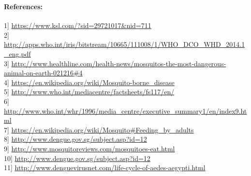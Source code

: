 \documentclass[11pt]{exam}
\begin{document}
\textbf{References:} \\ \\
 1] \url{https://www.ksl.com/?sid=29721017&nid=711} \\
 2] \url{http://apps.who.int/iris/bitstream/10665/111008/1/WHO_DCO_WHD_2014.1_eng.pdf}\\
 3] \url{http://www.healthline.com/health-news/mosquitos-the-most-dangerous-animal-on-earth-021216#4} \\
 4] \url{https://en.wikipedia.org/wiki/Mosquito-borne_disease} \\
 5] \url{http://www.who.int/mediacentre/factsheets/fs117/en/}\\
 6] \url{http://www.who.int/whr/1996/media_centre/executive_summary1/en/index9.html} \\
 7] \url{https://en.wikipedia.org/wiki/Mosquito#Feeding_by_adults}\\
 8] \url{http://www.dengue.gov.sg/subject.asp?id=12} \\
 9] \url{http://www.mosquitoreviews.com/mosquitoes-eat.html}\\
 10] \url{http://www.dengue.gov.sg/subject.asp?id=12}\\
 11] \url{http://www.denguevirusnet.com/life-cycle-of-aedes-aegypti.html}\\
\end{document}
